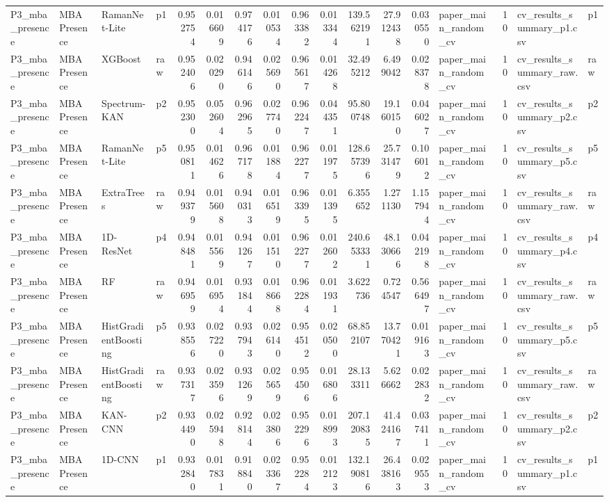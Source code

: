 \begin{tabular}{llllrrrrrrrrrlrll}
P3_mba_presence & MBA Presence & RamanNet-Lite & p1 & 0.952754 & 0.016609 & 0.974176 & 0.010534 & 0.963382 & 0.013344 & 139.562191 & 27.912438 & 0.030550 & paper_main_random_cv & 10 & cv_results_summary_p1.csv & p1 \\
P3_mba_presence & MBA Presence & XGBoost & raw & 0.952406 & 0.020290 & 0.946146 & 0.025690 & 0.965617 & 0.014268 & 32.495212 & 6.499042 & 0.028378 & paper_main_random_cv & 10 & cv_results_summary_raw.csv & raw \\
P3_mba_presence & MBA Presence & Spectrum-KAN & p2 & 0.952300 & 0.052604 & 0.962965 & 0.027740 & 0.962247 & 0.044351 & 95.800748 & 19.160150 & 0.046027 & paper_main_random_cv & 10 & cv_results_summary_p2.csv & p2 \\
P3_mba_presence & MBA Presence & RamanNet-Lite & p5 & 0.950811 & 0.014626 & 0.967178 & 0.011884 & 0.962277 & 0.011975 & 128.657396 & 25.731479 & 0.106012 & paper_main_random_cv & 10 & cv_results_summary_p5.csv & p5 \\
P3_mba_presence & MBA Presence & ExtraTrees & raw & 0.949379 & 0.015608 & 0.940313 & 0.016519 & 0.963395 & 0.011395 & 6.355652 & 1.271130 & 1.157944 & paper_main_random_cv & 10 & cv_results_summary_raw.csv & raw \\
P3_mba_presence & MBA Presence & 1D-ResNet & p4 & 0.948481 & 0.015569 & 0.941267 & 0.011510 & 0.962277 & 0.012602 & 240.653331 & 48.130666 & 0.042198 & paper_main_random_cv & 10 & cv_results_summary_p4.csv & p4 \\
P3_mba_presence & MBA Presence & RF & raw & 0.946959 & 0.016954 & 0.931844 & 0.018668 & 0.962284 & 0.011931 & 3.622736 & 0.724547 & 0.566497 & paper_main_random_cv & 10 & cv_results_summary_raw.csv & raw \\
P3_mba_presence & MBA Presence & HistGradientBoosting & p5 & 0.938556 & 0.027220 & 0.937943 & 0.026140 & 0.954512 & 0.020500 & 68.852107 & 13.770421 & 0.019163 & paper_main_random_cv & 10 & cv_results_summary_p5.csv & p5 \\
P3_mba_presence & MBA Presence & HistGradientBoosting & raw & 0.937317 & 0.023596 & 0.931269 & 0.025659 & 0.954506 & 0.016806 & 28.133311 & 5.626662 & 0.022832 & paper_main_random_cv & 10 & cv_results_summary_raw.csv & raw \\
P3_mba_presence & MBA Presence & KAN-CNN & p2 & 0.934490 & 0.025948 & 0.928144 & 0.023806 & 0.952296 & 0.018993 & 207.120835 & 41.424167 & 0.037411 & paper_main_random_cv & 10 & cv_results_summary_p2.csv & p2 \\
P3_mba_presence & MBA Presence & 1D-CNN & p1 & 0.932840 & 0.017831 & 0.918840 & 0.023367 & 0.952284 & 0.012123 & 132.190816 & 26.438163 & 0.029553 & paper_main_random_cv & 10 & cv_results_summary_p1.csv & p1 \\

\end{tabular}
